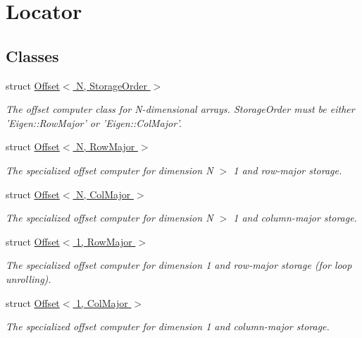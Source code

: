 \hypertarget{group___locator}{\section{Locator}
\label{group___locator}
}
\subsection*{Classes}
\begin{DoxyCompactItemize}
\item 
struct \hyperlink{struct_d_o_1_1_offset}{Offset$<$ N, Storage\-Order $>$}
\begin{DoxyCompactList}\small\item\em The offset computer class for N-\/dimensional arrays. Storage\-Order must be either 'Eigen\-::\-Row\-Major' or 'Eigen\-::\-Col\-Major'. \end{DoxyCompactList}\item 
struct \hyperlink{struct_d_o_1_1_offset_3_01_n_00_01_row_major_01_4}{Offset$<$ N, Row\-Major $>$}
\begin{DoxyCompactList}\small\item\em The specialized offset computer for dimension N $>$ 1 and row-\/major storage. \end{DoxyCompactList}\item 
struct \hyperlink{struct_d_o_1_1_offset_3_01_n_00_01_col_major_01_4}{Offset$<$ N, Col\-Major $>$}
\begin{DoxyCompactList}\small\item\em The specialized offset computer for dimension N $>$ 1 and column-\/major storage. \end{DoxyCompactList}\item 
struct \hyperlink{struct_d_o_1_1_offset_3_011_00_01_row_major_01_4}{Offset$<$ 1, Row\-Major $>$}
\begin{DoxyCompactList}\small\item\em The specialized offset computer for dimension 1 and row-\/major storage (for loop unrolling). \end{DoxyCompactList}\item 
struct \hyperlink{struct_d_o_1_1_offset_3_011_00_01_col_major_01_4}{Offset$<$ 1, Col\-Major $>$}
\begin{DoxyCompactList}\small\item\em The specialized offset computer for dimension 1 and column-\/major storage. \end{DoxyCompactList}\item 

\end{DoxyCompactItemize}
